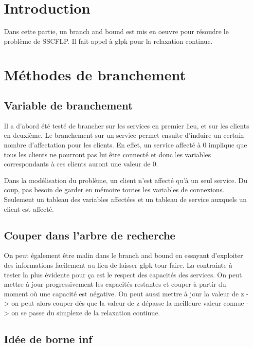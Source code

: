 \section{Introduction}

Dans cette partie, un branch and bound est mis en oeuvre pour résoudre le problème de SSCFLP.
Il fait appel à glpk pour la relaxation continue.

\section{Méthodes de branchement}

\subsection{Variable de branchement}

Il a d'abord été testé de brancher sur les services en premier lieu, et sur les clients en deuxième.
Le branchement sur un service permet ensuite d'induire un certain nombre d'affectation pour les clients.
En effet, un service affecté à 0 implique que tous les clients ne pourront pas lui être connecté et donc les variables correspondants à ces clients auront une valeur de 0. \newline

Dans la modélisation du problème, un client n'est affecté qu'à un seul service. Du coup, pas besoin de garder en mémoire toutes les variables de connexions.
Seulement un tableau des variables affectées et un tableau de service auxquels un client est affecté. \newline

\subsection{Couper dans l'arbre de recherche}

On peut également être malin dans le branch and bound en essayant d'exploiter des informations facilement au lieu de laisser glpk tour faire.
La contrainte à tester la plus évidente pour ça est le respect des capacités des services.
On peut mettre à jour progressivement les capacités restantes et couper à partir du moment où une capacité est négative.
On peut aussi mettre à jour la valeur de z -> on peut alors couper dès que la valeur de z dépasse la meilleure valeur connue -> on se passe du simplexe de la relaxation continue.

\subsection{Idée de borne inf}


